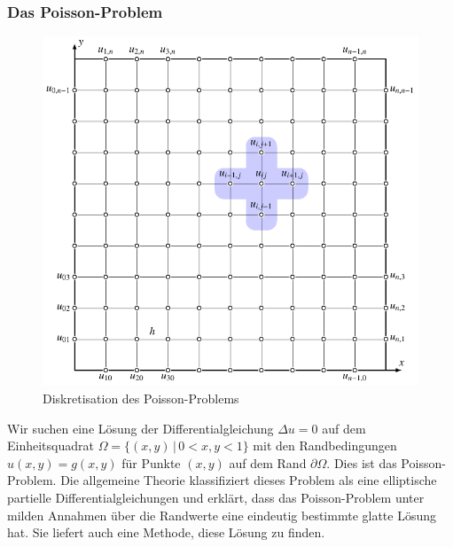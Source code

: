 \subsubsection{Das Poisson-Problem}
\begin{figure}
\centering
\includegraphics{chapters/2/poisson.pdf}
\caption{Diskretisation des Poisson-Problems
\label{skript:poisson:grid}}
\end{figure}
Wir suchen eine Lösung der Differentialgleichung
$\Delta u = 0$ auf dem Einheitsquadrat $\Omega=\{(x,y)\,|\, 0<x,y < 1\}$
mit den Randbedingungen $u(x,y)=g(x,y)$ für Punkte $(x,y)$ auf dem
Rand $\partial\Omega$.
%
Dies ist das Poisson-Problem.
Die allgemeine Theorie \cite{skript:pde} klassifiziert dieses Problem
als eine elliptische partielle Differentialgleichungen und erklärt,
dass das Poisson-Problem unter milden Annahmen über die Randwerte
eine eindeutig bestimmte glatte Lösung hat.
Sie liefert auch eine Methode, diese Lösung zu finden.

